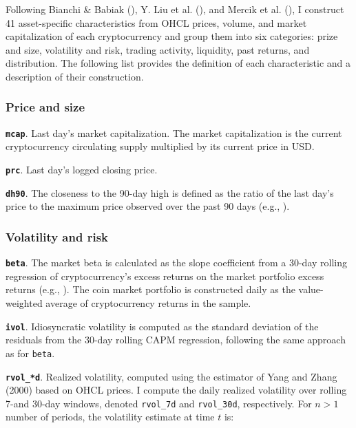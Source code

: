 \documentclass[
  12pt,
  a4paper,
  openany]{scrbook}
\begin{document}
Following Bianchi \& Babiak
(), Y. Liu et
al. (), and Mercik et al.
(),
I construct 41 asset-specific characteristics from OHCL prices, volume,
and market capitalization of each cryptocurrency and group them into six
categories: prize and size, volatility and risk, trading activity,
liquidity, past returns, and distribution. The following list provides
the definition of each characteristic and a description of their
construction.

\subsubsection{Price and size}\label{price-and-size}

\textbf{\texttt{mcap}}. Last day's market capitalization. The market
capitalization is the current cryptocurrency circulating supply
multiplied by its current price in USD.

\textbf{\texttt{prc}}. Last day's logged closing price.

\textbf{\texttt{dh90}}. The closeness to the 90-day high is defined as
the ratio of the last day's price to the maximum price observed over the
past 90 days (e.g., ).

\subsubsection{Volatility and risk}\label{volatility-and-risk}

\textbf{\texttt{beta}}. The market beta is calculated as the slope
coefficient from a 30-day rolling regression of cryptocurrency's excess
returns on the market portfolio excess returns (e.g.,
).
The coin market portfolio is constructed daily as the value-weighted
average of cryptocurrency returns in the sample.

\textbf{\texttt{ivol}}. Idiosyncratic volatility is computed as the
standard deviation of the residuals from the 30-day rolling CAPM
regression, following the same approach as for \texttt{beta}.

\textbf{\texttt{rvol\_*d}}. Realized volatility, computed using the
estimator of Yang and Zhang (2000) based on OHCL prices. I compute the
daily realized volatility over rolling 7-and 30-day windows, denoted
\texttt{rvol\_7d} and \texttt{rvol\_30d}, respectively. For \(n > 1\)
number of periods, the volatility estimate at time \(t\) is:
\end{document}
